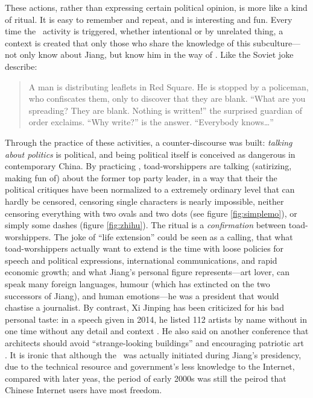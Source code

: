 These actions, rather than expressing certain political opinion, is more like a kind of ritual. It is easy to remember and repeat, and is interesting and fun. Every time the \moha\ activity is triggered, whether intentional or by unrelated thing, a context is created that only those who share the knowledge of this subculture---not only know about Jiang, but know him in the way of \moha. Like the Soviet joke describe:
\begin{quote}
	A man is distributing leaflets in Red Square. He is stopped by a policeman, who confiscates them, only to discover that they are blank. ``What are you spreading? They are blank. Nothing is written!'' the surprised guardian of order exclaims. ``Why write?'' is the answer. ``Everybody knows\ldots'' \citep[p.~2]{przeworski_prologue_1991}
\end{quote}
Through the practice of these activities, a counter-discourse was built: \textit{talking about politics} is political, and being political itself is conceived as dangerous in contemporary China. By practicing \moha, toad-worshippers are talking (satirizing, making fun of) about the former top party leader, in a way that their the political critiques have been normalized to a extremely ordinary level that can hardly be censored, censoring single characters is nearly impossible, neither censoring everything with two ovals and two dots (see figure \vref{fig:simplemo}), or simply some dashes (figure \vref{fig:zhihu}). The ritual is a \textit{confirmation} between toad-worshippers. The joke of ``life extension'' could be seen as a calling, that what toad-worshippers actually want to extend is the time with loose policies for speech and political expressions, international communications, and rapid economic growth; and what Jiang's personal figure represents---art lover, can speak many foreign languages, humour (which has  extincted on the two successors of Jiang), and human emotions---he was a president that would chastise a journalist. By contrast, Xi Jinping has been criticized for his bad personal taste: in a speech given in 2014, he listed 112 artists by name without in one time without any detail and context \citep{__2015-3,chin_year_2015}. He also said on another conference that architects should avoid ``strange-looking buildings'' and encouraging patriotic art \citep{alyssa_abkowitz_xi_2014}. It is ironic that although the \gfw\ was actually initiated during Jiang's presidency, due to the technical resource and government's less knowledge to the Internet, compared with later yeas, the period of early 2000s was still the peirod that Chinese Internet users have most freedom.
